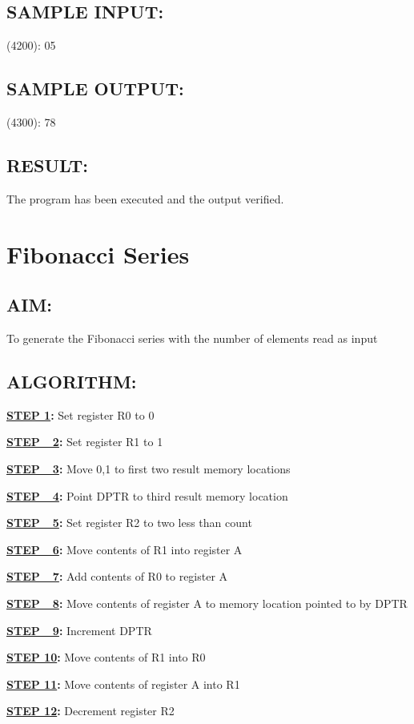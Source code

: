 \documentclass[a4paper,28pt,twoside,openright]{report}
\begin{document}
\section*{SAMPLE INPUT:}
(4200): 05

\section*{SAMPLE OUTPUT:}
(4300): 78
\section*{RESULT:}

The program has been executed and the output verified.
%
%
%
%
\chapter{Fibonacci Series}
\section*{AIM:}
To generate the Fibonacci series with the number of elements read as input
\section*{ALGORITHM:}
\textbf{\underline{STEP 1}:} Set register R0 to 0

\textbf{\underline{STEP\ \ 2}:} Set register R1 to 1

\textbf{\underline{STEP\ \ 3}:} Move 0,1 to first two result memory locations

\textbf{\underline{STEP\ \ 4}:} Point DPTR to third result memory location

\textbf{\underline{STEP\ \ 5}:} Set register R2 to two less than count

\textbf{\underline{STEP\ \ 6}:} Move contents of R1 into register A

\textbf{\underline{STEP\ \ 7}:} Add contents of R0 to register A

\textbf{\underline{STEP\ \ 8}:} Move contents of register A to memory location pointed to by DPTR

\textbf{\underline{STEP\ \ 9}:} Increment DPTR

\textbf{\underline{STEP 10}:} Move contents of R1 into R0

\textbf{\underline{STEP 11}:} Move contents of register A into R1

\textbf{\underline{STEP 12}:} Decrement register R2
\end{document}
